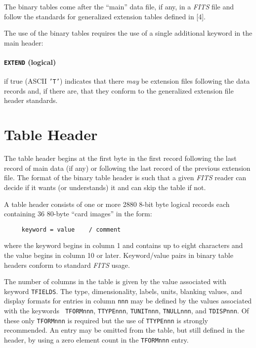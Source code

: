    The binary tables come after the ``main'' data file, if any, 
in a {\em FITS\/} file and follow the standards for generalized extension
tables defined in [4].

The use of the binary tables requires the use of a single
additional keyword in the main header:

\paragraph{{\tt EXTEND} (logical)} 
if 
true (ASCII {\tt 'T'}) indicates that there {\it may} 
be extension files following the data records and, if there are, 
that they conform to the generalized extension file header standards.

\section {Table Header}

The table header begins at the first byte in the first record following the
last record of main data (if any) or following the last record of the
previous extension file.  The format of the binary table
header is such that a given {\em FITS\/} reader can decide if it wants
(or understands) it and can skip the table if not.

A table header consists of one or more 2880 8-bit byte logical records
each containing 36 80-byte ``card images'' in the form:

\begin{verbatim}
     keyword = value    / comment
\end{verbatim}
where the keyword begins in column 1 and contains up to eight
characters and the value begins in column 10 or later.  Keyword/value
pairs in binary table headers conform to standard {\em FITS\/} usage.

   The number of columns in the table is given by the value associated
with keyword {\tt TFIELDS}.  
The type, dimensionality, labels, units, 
blanking values, and display formats for entries in column {\tt nnn} may be
defined by the values 
associated with the keywords {\tt
TFORMnnn}, 
{\tt TTYPEnnn}, {\tt TUNITnnn}, {\tt TNULLnnn}, and {\tt TDISPnnn}.  
Of these only {\tt TFORMnnn} is required but the
use of 
{\tt TTYPEnnn} is strongly recommended.  An entry
may be omitted from the table, but still defined in the header, 
by using a zero element count in the {\tt TFORMnnn}
entry.

